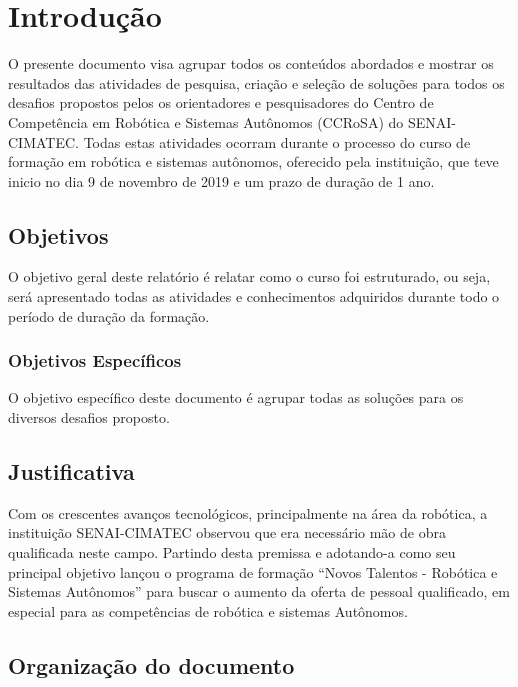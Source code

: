 \chapter{Introdução}
\label{chap:intro}

O presente documento visa agrupar todos os conteúdos abordados e mostrar os resultados das atividades de pesquisa, criação e seleção de soluções para todos os desafios propostos pelos os orientadores e pesquisadores do Centro de Competência em Robótica e Sistemas Autônomos (CCRoSA) do SENAI-CIMATEC. Todas estas atividades ocorram durante o processo do curso de formação em robótica e sistemas autônomos, oferecido pela instituição, que teve inicio no dia 9 de novembro de 2019 e um prazo de duração de 1 ano.



\section{Objetivos}
\label{sec:obj}

O objetivo geral deste relatório é relatar como o curso foi estruturado, ou seja, será apresentado todas as atividades e conhecimentos adquiridos durante todo o período de duração da formação. 


\subsection{Objetivos Específicos}
\label{ssec:objesp}

O objetivo específico deste documento é agrupar todas as soluções para os diversos desafios proposto. 

\section{Justificativa}
\label{sec:justi}

Com os crescentes avanços tecnológicos, principalmente na área da robótica, a instituição SENAI-CIMATEC observou que era necessário mão de obra qualificada neste campo. Partindo desta premissa e adotando-a como seu principal objetivo lançou o programa de formação ``Novos Talentos - Robótica e Sistemas Autônomos'' para buscar o aumento da oferta de pessoal qualificado, em especial para as competências de robótica e sistemas Autônomos. 


\section{Organização do documento}
\label{section:organizacao}

